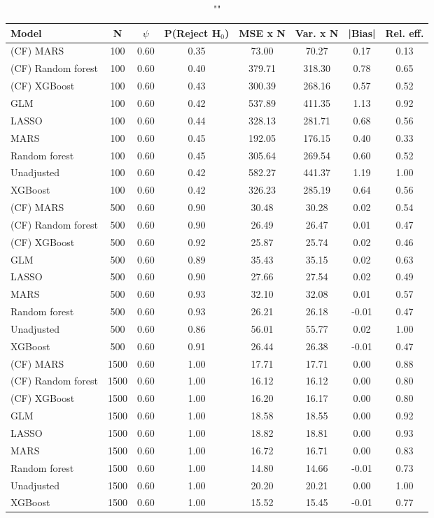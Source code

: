 \begin{table}
\centering
\caption{""}
\begin{tabular}{lccccccc}
\toprule
Model & N & $\psi$ & P(Reject H$_0$) & MSE x N & Var. x N & |Bias| & Rel. eff.\\ \midrule
(CF) MARS & 100 & 0.60 & 0.35 &  73.00 &  70.27 &  0.17 & 0.13 \\ 
(CF) Random forest & 100 & 0.60 & 0.40 & 379.71 & 318.30 &  0.78 & 0.65 \\ 
(CF) XGBoost & 100 & 0.60 & 0.43 & 300.39 & 268.16 &  0.57 & 0.52 \\ 
GLM & 100 & 0.60 & 0.42 & 537.89 & 411.35 &  1.13 & 0.92 \\ 
LASSO & 100 & 0.60 & 0.44 & 328.13 & 281.71 &  0.68 & 0.56 \\ 
MARS & 100 & 0.60 & 0.45 & 192.05 & 176.15 &  0.40 & 0.33 \\ 
Random forest & 100 & 0.60 & 0.45 & 305.64 & 269.54 &  0.60 & 0.52 \\ 
Unadjusted & 100 & 0.60 & 0.42 & 582.27 & 441.37 &  1.19 & 1.00 \\ 
XGBoost & 100 & 0.60 & 0.42 & 326.23 & 285.19 &  0.64 & 0.56 \\ \addlinespace 
(CF) MARS & 500 & 0.60 & 0.90 &  30.48 &  30.28 &  0.02 & 0.54 \\ 
(CF) Random forest & 500 & 0.60 & 0.90 &  26.49 &  26.47 &  0.01 & 0.47 \\ 
(CF) XGBoost & 500 & 0.60 & 0.92 &  25.87 &  25.74 &  0.02 & 0.46 \\ 
GLM & 500 & 0.60 & 0.89 &  35.43 &  35.15 &  0.02 & 0.63 \\ 
LASSO & 500 & 0.60 & 0.90 &  27.66 &  27.54 &  0.02 & 0.49 \\ 
MARS & 500 & 0.60 & 0.93 &  32.10 &  32.08 &  0.01 & 0.57 \\ 
Random forest & 500 & 0.60 & 0.93 &  26.21 &  26.18 & -0.01 & 0.47 \\ 
Unadjusted & 500 & 0.60 & 0.86 &  56.01 &  55.77 &  0.02 & 1.00 \\ 
XGBoost & 500 & 0.60 & 0.91 &  26.44 &  26.38 & -0.01 & 0.47 \\ \addlinespace 
(CF) MARS & 1500 & 0.60 & 1.00 &  17.71 &  17.71 &  0.00 & 0.88 \\ 
(CF) Random forest & 1500 & 0.60 & 1.00 &  16.12 &  16.12 &  0.00 & 0.80 \\ 
(CF) XGBoost & 1500 & 0.60 & 1.00 &  16.20 &  16.17 &  0.00 & 0.80 \\ 
GLM & 1500 & 0.60 & 1.00 &  18.58 &  18.55 &  0.00 & 0.92 \\ 
LASSO & 1500 & 0.60 & 1.00 &  18.82 &  18.81 &  0.00 & 0.93 \\ 
MARS & 1500 & 0.60 & 1.00 &  16.72 &  16.71 &  0.00 & 0.83 \\ 
Random forest & 1500 & 0.60 & 1.00 &  14.80 &  14.66 & -0.01 & 0.73 \\ 
Unadjusted & 1500 & 0.60 & 1.00 &  20.20 &  20.21 &  0.00 & 1.00 \\ 
XGBoost & 1500 & 0.60 & 1.00 &  15.52 &  15.45 & -0.01 & 0.77 \\
\bottomrule
\end{tabular}
\end{table}

